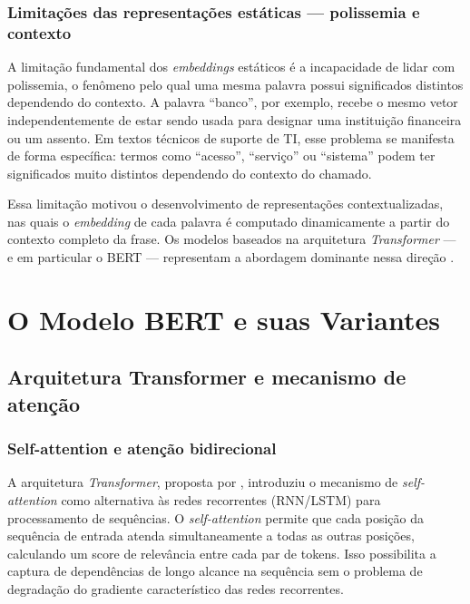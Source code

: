 \documentclass[
    12pt,                %
    openright,           %
    oneside,             %
    a4paper,             %
    english,             %
    brazil               %
]{abntex2}
\begin{document}
\subsubsection{Limitações das representações estáticas — polissemia e contexto}
\label{subsubsec:pln_limitacoes}

A limitação fundamental dos \textit{embeddings} estáticos é a incapacidade de lidar com polissemia, o fenômeno pelo qual uma mesma palavra possui significados distintos dependendo do contexto. A palavra ``banco'', por exemplo, recebe o mesmo vetor independentemente de estar sendo usada para designar uma instituição financeira ou um assento. Em textos técnicos de suporte de TI, esse problema se manifesta de forma específica: termos como ``acesso'', ``serviço'' ou ``sistema'' podem ter significados muito distintos dependendo do contexto do chamado.

Essa limitação motivou o desenvolvimento de representações contextualizadas, nas quais o \textit{embedding} de cada palavra é computado dinamicamente a partir do contexto completo da frase. Os modelos baseados na arquitetura \textit{Transformer} —  e em particular o BERT — representam a abordagem dominante nessa direção \cite{devlin2019}.

\section{O Modelo BERT e suas Variantes}
\label{sec:bert}

\subsection{Arquitetura Transformer e mecanismo de atenção}
\label{subsec:bert_transformer}

\subsubsection{Self-attention e atenção bidirecional}
\label{subsubsec:bert_attention}

A arquitetura \textit{Transformer}, proposta por , introduziu o mecanismo de \textit{self-attention} como alternativa às redes recorrentes (RNN/LSTM) para processamento de sequências. O \textit{self-attention} permite que cada posição da sequência de entrada atenda simultaneamente a todas as outras posições, calculando um score de relevância entre cada par de tokens. Isso possibilita a captura de dependências de longo alcance na sequência sem o problema de degradação do gradiente característico das redes recorrentes.
\end{document}
